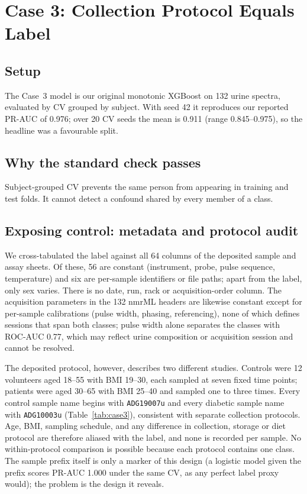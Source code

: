 \documentclass[conference]{IEEEtran}
\newcommand{\verified}[1]{#1}  %
\begin{document}
\section{Case 3: Collection Protocol Equals Label}
\label{sec:case3}
\subsection{Setup}
The Case~3 model is our original monotonic XGBoost on 132 urine spectra,
evaluated by CV grouped by subject. With seed 42 it reproduces our reported
PR-AUC of \verified{0.976}; over 20 CV seeds the mean is \verified{0.911}
(range \verified{0.845--0.975}), so the headline was a favourable split.

\subsection{Why the standard check passes}
Subject-grouped CV prevents the same person from appearing in training and
test folds. It cannot detect a confound shared by every member of a class.

\subsection{Exposing control: metadata and protocol audit}
We cross-tabulated the label against all 64 columns of the deposited sample
and assay sheets. Of these, 56 are constant (instrument, probe, pulse
sequence, temperature) and six are per-sample identifiers or file paths;
apart from the label, only sex varies. There is no date, run, rack or
acquisition-order column. The acquisition parameters in the 132 nmrML headers
are likewise constant except for per-sample calibrations (pulse width,
phasing, referencing), none of which defines sessions that span both classes;
pulse width alone separates the classes with ROC-AUC \verified{0.77}, which
may reflect urine composition or acquisition session and cannot be resolved.

The deposited protocol, however, describes two different studies. Controls
were 12 volunteers aged 18--55 with BMI 19--30, each sampled at seven fixed
time points; patients were aged 30--65 with BMI 25--40 and sampled one to
three times. Every control sample name begins with \verb|ADG19007u| and
every diabetic sample name with \verb|ADG10003u| (Table~\ref{tab:case3}),
consistent with separate collection protocols. Age, BMI, sampling schedule,
and any difference in collection, storage or diet protocol are therefore
aliased with the label, and none is recorded per sample. No within-protocol
comparison is possible because each protocol contains one class. The sample
prefix itself is only a marker of this design (a logistic model given the
prefix scores PR-AUC \verified{1.000} under the same CV, as any perfect
label proxy would); the problem is the design it reveals.
\end{document}
